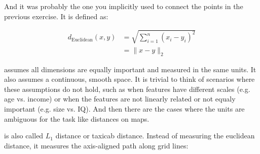 And it was probably the one you implicitly used to connect the points in the previous exercise. It is defined as:

\begin{align*}
    d_{\text{Euclidean}}(x, y) &= \sqrt{\sum_{i=1}^{n} (x_i - y_i)^2} \\
    &= \|x - y\|_2
\end{align*}


 assumes all dimensions are equally important and measured in the same units. It also assumes a continuous, smooth space.
It is trivial to think of scenarios where these assumptions do not hold, such as when features have different scales (e.g. age vs. income)
or when the features are not linearly related or not equaly important (e.g. size vs. IQ). And then there are the cases where the
units are ambiguous for the task like distances on maps.





\vspace{2.5em}
 is also called $L_1$ distance or taxicab distance. Instead of measuring the euclidean distance, it measures the axis-aligned path along grid lines:



